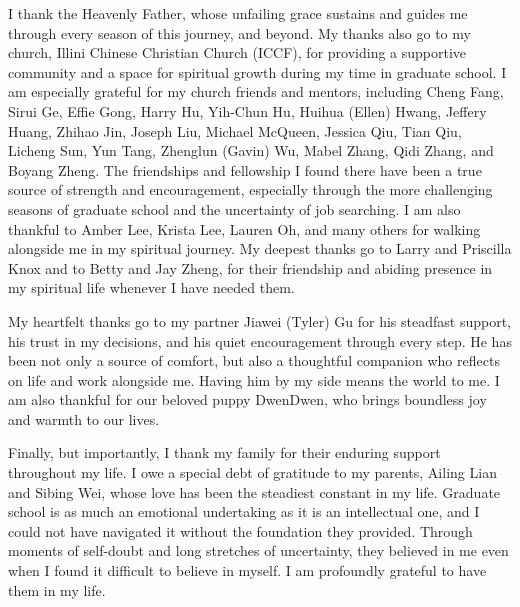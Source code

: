 \documentclass[thesis]{uofithesis} %
\begin{document}
{    I thank the Heavenly Father, whose unfailing grace sustains
    and guides me through every season of this journey, and beyond.
    My thanks also go to my church, Illini Chinese Christian Church (ICCF),
    for providing a supportive community and a space for spiritual growth
    during my time in graduate school. I am especially grateful for my
    church friends and mentors, including Cheng Fang, Sirui Ge, Effie
    Gong, Harry Hu, Yih-Chun Hu, Huihua (Ellen) Hwang, Jeffery Huang,
    Zhihao Jin, Joseph Liu, Michael McQueen, Jessica Qiu, Tian Qiu,
    Licheng Sun, Yun Tang, Zhenglun (Gavin) Wu, Mabel Zhang, Qidi Zhang,
    and Boyang Zheng. The friendships and fellowship I found there have
    been a true source of strength and encouragement, especially
    through the more challenging seasons of graduate school and the
    uncertainty of job searching. I am also thankful to Amber Lee,
    Krista Lee, Lauren Oh, and many others for walking alongside me in
    my spiritual journey. My deepest thanks go to Larry and Priscilla
    Knox and to Betty and Jay Zheng, for their friendship and abiding
    presence in my spiritual life whenever I have needed them.

    My heartfelt thanks go to my partner Jiawei (Tyler) Gu for his
    steadfast support, his trust in my decisions, and his quiet
    encouragement through every step. He has been not only a source of
    comfort, but also a thoughtful companion who reflects on life and
    work alongside me. Having him by my side means the world to me. I
    am also thankful for our beloved puppy DwenDwen, who brings
    boundless joy and warmth to our lives.

    Finally, but importantly, I thank my family for their enduring
    support throughout my life. I owe a special debt of
    gratitude to my parents, Ailing Lian and Sibing Wei, whose love has
    been the steadiest constant in my life. Graduate school is as much an
    emotional undertaking as it is an intellectual one, and I could not
    have navigated it without the foundation they provided. Through moments
    of self-doubt and long stretches of uncertainty, they believed in me
    even when I found it difficult to believe in myself. I am profoundly
    grateful to have them in my life.
}

\tableofcontents

\end{document}
